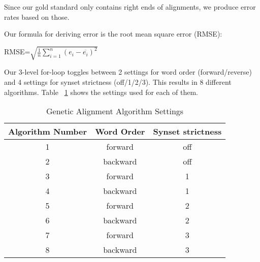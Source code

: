 Since our gold standard only contains right ends of alignments, we produce error rates based on those. %

Our formula for deriving error is the root mean square error (RMSE):

\begin{center}
	RMSE=$\sqrt{\frac{1}{n}\sum_{i=1}^{n}{(e_i-\overline{e_i})^2}}$
\end{center}

Our 3-level for-loop toggles between 2 settings for word order (forward/reverse) and 4 settings for synset strictness (off/1/2/3). This results in 8 different algorithms. Table ~\ref{tab:settings} shows the settings used for each of them.

\begin{table}[center]
	\centering
	\begin{tabular} {| c | c | c |}
		\hline	\textbf{Algorithm Number} & \textbf{Word Order} & \textbf{Synset strictness}\\
		\hline	1	&	forward		&	off	\\
		\hline	2	&	backward	&	off	\\
		\hline	3	&	forward		&	1	\\
		\hline	4	&	backward	&	1	\\
		\hline	5	&	forward		&	2	\\
		\hline	6	&	backward	&	2	\\
		\hline	7	&	forward		&	3	\\
		\hline	8	&	backward	&	3	\\ \hline
	\end{tabular}
	\caption{Genetic Alignment Algorithm Settings}
	\label{tab:settings}
\end{table}
